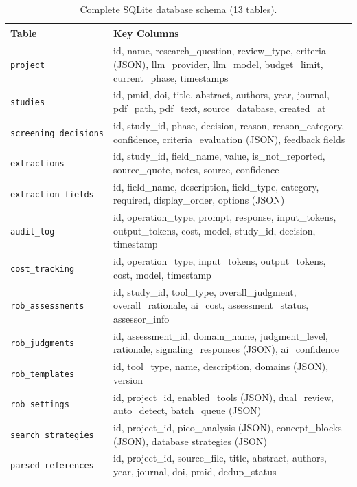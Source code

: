 \documentclass[11pt,a4paper]{article}
\begin{document}
\begin{table}[H]
\centering\small
\begin{tabular}{lp{8cm}}
\toprule
\textbf{Table} & \textbf{Key Columns} \\
\midrule
\texttt{project} & id, name, research\_question, review\_type, criteria (JSON), llm\_provider, llm\_model, budget\_limit, current\_phase, timestamps \\
\texttt{studies} & id, pmid, doi, title, abstract, authors, year, journal, pdf\_path, pdf\_text, source\_database, created\_at \\
\texttt{screening\_decisions} & id, study\_id, phase, decision, reason, reason\_category, confidence, criteria\_evaluation (JSON), feedback fields \\
\texttt{extractions} & id, study\_id, field\_name, value, is\_not\_reported, source\_quote, notes, source, confidence \\
\texttt{extraction\_fields} & id, field\_name, description, field\_type, category, required, display\_order, options (JSON) \\
\texttt{audit\_log} & id, operation\_type, prompt, response, input\_tokens, output\_tokens, cost, model, study\_id, decision, timestamp \\
\texttt{cost\_tracking} & id, operation\_type, input\_tokens, output\_tokens, cost, model, timestamp \\
\texttt{rob\_assessments} & id, study\_id, tool\_type, overall\_judgment, overall\_rationale, ai\_cost, assessment\_status, assessor\_info \\
\texttt{rob\_judgments} & id, assessment\_id, domain\_name, judgment\_level, rationale, signaling\_responses (JSON), ai\_confidence \\
\texttt{rob\_templates} & id, tool\_type, name, description, domains (JSON), version \\
\texttt{rob\_settings} & id, project\_id, enabled\_tools (JSON), dual\_review, auto\_detect, batch\_queue (JSON) \\
\texttt{search\_strategies} & id, project\_id, pico\_analysis (JSON), concept\_blocks (JSON), database strategies (JSON) \\
\texttt{parsed\_references} & id, project\_id, source\_file, title, abstract, authors, year, journal, doi, pmid, dedup\_status \\
\bottomrule
\end{tabular}
\caption{Complete SQLite database schema (13 tables).}
\end{table}
\end{document}

